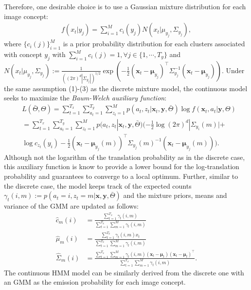 \documentclass[journal]{IEEEtran}
\begin{document}
Therefore, one desirable choice is to use a Gaussian mixture distribution for each image concept: 
\begin{align}\label{eq:gmm_prob}
    f(x_t|y_j) = \sum_{i=1}^{M} c_i(y_j) N(x_t|\mu_{y_j}, \Sigma_{y_j}),
\end{align}
where $\{c_i(j)\}_{i=1}^M$ is a prior probability distribution for each clusters associated with concept $y_j$ with $\sum_{i=1}^M c_i(j) = 1, \forall j \in \{1, \cdots, T_y\}$ and $N(x_t|\mu_{y_j}, \Sigma_{y_j}) := \frac{1}{((2\pi)^d |\Sigma_{y_j}|)^{1/2}}\exp\left(-\frac{1}{2}(\mathbf x_t - \mathbf \mu_{y_j})^\top\Sigma_{y_j}^{-1}(\mathbf x_t - \mathbf \mu_{y_j})\right)$. Under the same assumption (1)-(3) as the discrete mixture model, the continuous model seeks to maximize the \textit{Baum-Welch auxiliary function}:
\begin{align}\label{multimodal_gmm_objective}
&L(\bar{\Theta}, \Theta) = \sum_{t=1}^{T_x}\sum_{a_t=1}^{T_y}\sum_{z_t=1}^M p(a_t,z_t|\mathbf x_t, \mathbf y, \bar {\Theta}) \log f(\mathbf x_t, a_t | \mathbf y, \Theta)\\
&= \sum_{t=1}^{T_x}\sum_{a_t=1}^{T_y}\sum_{z_t=1}^M p(a_t, z_t|\mathbf x_t, \mathbf y, \bar{\Theta})(-\frac{1}{2}\log (2\pi)^d|\Sigma_{y_i}(m)| + \nonumber\\
&\log c_{z_t}(y_i) - \frac{1}{2} (\mathbf{x}_t - \mathbf \mu_{y_j}(m))^{\top}\Sigma_{y_j}(m)^{-1}(\mathbf{x}_t - \mathbf \mu_{y_j}(m))).
\end{align}
Although not the logarithm of the translation probability as in the discrete case, this auxiliary function is know to provide a lower bound for the log-translation probability and guarantees to converge to a local optimum. Further, similar to the discrete case, the model keeps track of the expected counts $\gamma_t(i, m) := p(a_t=i, z_t=m|\mathbf x, \mathbf y, \bar \Theta)$ and the mixture priors, means and variance of the GMM are updated as follows: 
\begin{align}\label{eq:cont_gmm_em_update}
    \hat c_m(i) &= \frac{\sum_{t=1}^{T_x}\gamma_t(i, m)}{\sum_{t=1}^{T_x}\sum_{m=1}^{M}\gamma_t(i, m)}\\
    \hat \mu_m(i) &= \frac{\sum_{t=1}^{T_x}\gamma_t(i, m)x_t}{\sum_{t=1}^{T_x}\sum_{m=1}^{M}\gamma_t(i, m)}\\
    \hat \Sigma_m(i) &= 
    \frac{\sum_{t=1}^{T_x}\sum_{m=1}^{M}\gamma_t(i, m)(\mathbf x_t - \mathbf \mu_t)(\mathbf x_t - \mathbf \mu_t)^\top}{\sum_{t=1}^{T_x}\sum_{m=1}^{M}\gamma_t(i, m)}.
\end{align}
The continuous HMM model can be similarly derived from the discrete one with an GMM as the emission probability for each image concept. 
\end{document}
